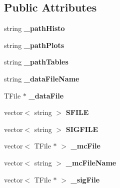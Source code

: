 \subsection*{Public Attributes}
\begin{DoxyCompactItemize}
\item 
\hypertarget{classDrawPlots_a5205018a5341057f26df6907a2f1702f}{
string {\bfseries \_\-pathHisto}}
\label{classDrawPlots_a5205018a5341057f26df6907a2f1702f}

\item 
\hypertarget{classDrawPlots_ab28fa8c07908b4b38e688288435becab}{
string {\bfseries \_\-pathPlots}}
\label{classDrawPlots_ab28fa8c07908b4b38e688288435becab}

\item 
\hypertarget{classDrawPlots_a8d4d1102ca5d268d7c69b1391a407cd8}{
string {\bfseries \_\-pathTables}}
\label{classDrawPlots_a8d4d1102ca5d268d7c69b1391a407cd8}

\item 
\hypertarget{classDrawPlots_ac8ef3f5514e8d9c09e4d191b104a5720}{
string {\bfseries \_\-dataFileName}}
\label{classDrawPlots_ac8ef3f5514e8d9c09e4d191b104a5720}

\item 
\hypertarget{classDrawPlots_a3bc5f7a584ce740431fdbbc833e74323}{
TFile $\ast$ {\bfseries \_\-dataFile}}
\label{classDrawPlots_a3bc5f7a584ce740431fdbbc833e74323}

\item 
\hypertarget{classDrawPlots_ad341daa3ee34ca31c2a6d3b6b29448a0}{
vector$<$ string $>$ {\bfseries SFILE}}
\label{classDrawPlots_ad341daa3ee34ca31c2a6d3b6b29448a0}

\item 
\hypertarget{classDrawPlots_a6a0a3388d8537a5490454e452dd4f610}{
vector$<$ string $>$ {\bfseries SIGFILE}}
\label{classDrawPlots_a6a0a3388d8537a5490454e452dd4f610}

\item 
\hypertarget{classDrawPlots_a9b0735dba88f517c856ad178ba0f864a}{
vector$<$ TFile $\ast$ $>$ {\bfseries \_\-mcFile}}
\label{classDrawPlots_a9b0735dba88f517c856ad178ba0f864a}

\item 
\hypertarget{classDrawPlots_aec88cfd38eab95a0147aec7a5025f10b}{
vector$<$ string $>$ {\bfseries \_\-mcFileName}}
\label{classDrawPlots_aec88cfd38eab95a0147aec7a5025f10b}

\item 
\hypertarget{classDrawPlots_a9c251d5d6599ccc880ac9227f88286d6}{
vector$<$ TFile $\ast$ $>$ {\bfseries \_\-sigFile}}
\label{classDrawPlots_a9c251d5d6599ccc880ac9227f88286d6}


\end{DoxyCompactItemize}
